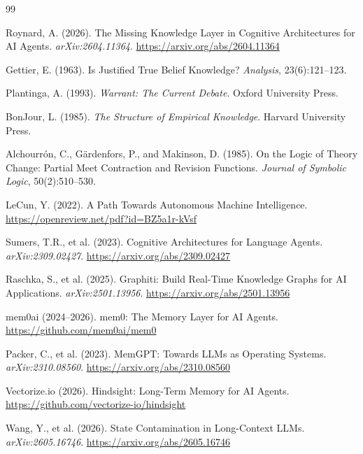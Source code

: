 \documentclass[11pt,a4paper]{article}
\begin{document}

\begin{thebibliography}{99}

Roynard, A. (2026).
\newblock The Missing Knowledge Layer in Cognitive Architectures for AI Agents.
\newblock \textit{arXiv:2604.11364}. \url{https://arxiv.org/abs/2604.11364}

Gettier, E. (1963).
\newblock Is Justified True Belief Knowledge?
\newblock \textit{Analysis}, 23(6):121--123.

Plantinga, A. (1993).
\newblock \textit{Warrant: The Current Debate}.
\newblock Oxford University Press.

BonJour, L. (1985).
\newblock \textit{The Structure of Empirical Knowledge}.
\newblock Harvard University Press.

Alchourr{\'o}n, C., G{\"a}rdenfors, P., and Makinson, D. (1985).
\newblock On the Logic of Theory Change: Partial Meet Contraction and Revision Functions.
\newblock \textit{Journal of Symbolic Logic}, 50(2):510--530.

LeCun, Y. (2022).
\newblock A Path Towards Autonomous Machine Intelligence.
\newblock \url{https://openreview.net/pdf?id=BZ5a1r-kVsf}

Sumers, T.R., et al. (2023).
\newblock Cognitive Architectures for Language Agents.
\newblock \textit{arXiv:2309.02427}. \url{https://arxiv.org/abs/2309.02427}

Raschka, S., et al. (2025).
\newblock Graphiti: Build Real-Time Knowledge Graphs for AI Applications.
\newblock \textit{arXiv:2501.13956}. \url{https://arxiv.org/abs/2501.13956}

mem0ai (2024--2026).
\newblock mem0: The Memory Layer for AI Agents.
\newblock \url{https://github.com/mem0ai/mem0}

Packer, C., et al. (2023).
\newblock MemGPT: Towards LLMs as Operating Systems.
\newblock \textit{arXiv:2310.08560}. \url{https://arxiv.org/abs/2310.08560}

Vectorize.io (2026).
\newblock Hindsight: Long-Term Memory for AI Agents.
\newblock \url{https://github.com/vectorize-io/hindsight}

Wang, Y., et al. (2026).
\newblock State Contamination in Long-Context LLMs.
\newblock \textit{arXiv:2605.16746}. \url{https://arxiv.org/abs/2605.16746}


\end{thebibliography}
\end{document}
